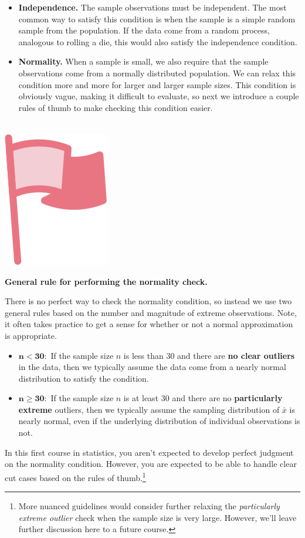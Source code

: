 \documentclass[
  10pt,
  openany]{book}
\providecommand{\tightlist}{%
  \setlength{\itemsep}{0pt}\setlength{\parskip}{0pt}}
\newenvironment{mdframedwithfootImportant}
{   
    \savenotes
    \begin{mdframed}[%
    topline=true, bottomline=true, linecolor=oiR, linewidth=0.5pt,
    rightline=false, leftline=false,
    backgroundcolor=oiLGray]
    \renewcommand{\thempfootnote}{\arabic{footnote}}
    }
{
    \end{mdframed}
    \spewnotes
}
\newenvironment{important}{
    \let\oldtextbf\textbf
    \renewcommand{\textbf}[1]{{\textcolor{oiR}{\oldtextbf{##1}}}}
\vspace{4mm}
\begin{mdframedwithfootImportant}
\begin{minipage}[t]{0.10\textwidth}
{$\:$ \\ \setkeys{Gin}{width=2.5em,keepaspectratio}\includegraphics{images/_icons/important.png}}
\end{minipage}
\hfill
\begin{minipage}[t]{0.90\textwidth}
\vspace{-2mm}
\setlength{\parskip}{1em}
}{\end{minipage}
\end{mdframedwithfootImportant}
\vspace{4mm}
}
\begin{document}
\begin{itemize}
\item
  \textbf{Independence.} The sample observations must be independent. The most common way to satisfy this condition is when the sample is a simple random sample from the population.
  If the data come from a random process, analogous to rolling a die, this would also satisfy the independence condition.
\item
  \textbf{Normality.} When a sample is small, we also require that the sample observations come from a normally distributed population.
  We can relax this condition more and more for larger and larger sample sizes.
  This condition is obviously vague, making it difficult to evaluate, so next we introduce a couple rules of thumb to make checking this condition easier.
\end{itemize}

\begin{important}

\textbf{General rule for performing the normality check.}

There is no perfect way to check the normality condition, so instead we use two general rules based on the number and magnitude of extreme observations.
Note, it often takes practice to get a sense for whether or not a normal approximation is appropriate.

\begin{itemize}
\tightlist
\item
  \(\mathbf{n < 30}:\) If the sample size \(n\) is less than 30 and there are \textbf{no clear outliers} in the data, then we typically assume the data come from a nearly normal distribution to satisfy the condition.
\item
  \(\mathbf{n \geq 30}:\) If the sample size \(n\) is at least 30 and there are no \textbf{particularly extreme} outliers, then we typically assume the sampling distribution of \(\bar{x}\) is nearly normal, even if the underlying distribution of individual observations is not.
\end{itemize}

\end{important}

In this first course in statistics, you aren't expected to develop perfect judgment on the normality condition.
However, you are expected to be able to handle clear cut cases based on the rules of thumb.\footnote{More nuanced guidelines would consider further relaxing the \emph{particularly extreme outlier} check when the sample size is very large.
  However, we'll leave further discussion here to a future course.}
\end{document}

